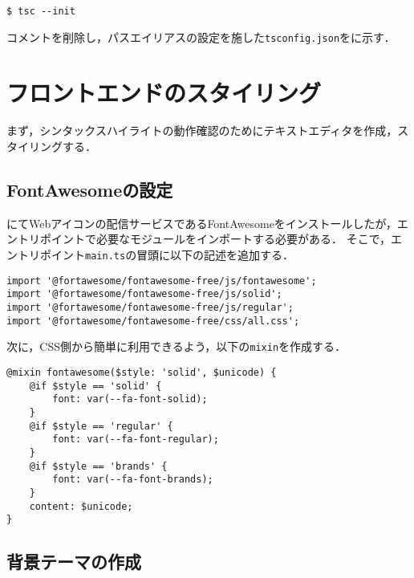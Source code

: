 \documentclass[autodetect-engine,dvi=dvipdfmx,ja=standard,
               a4j,11pt]{bxjsarticle}
\newcommand{\figref}[1]{\makebox{図~\ref{#1}}}
\newcommand{\subsecref}[1]{\makebox{第~\ref{#1}~節}}
\begin{document}
\begin{Verbatim}[numbers=none, xleftmargin=8mm, numbersep=6pt, fontsize=\small, baselinestretch=0.8]
$ tsc --init
\end{Verbatim}

コメントを削除し，パスエイリアスの設定を施した\verb|tsconfig.json|を\figref{prog:tsconfig}に示す．




\section{フロントエンドのスタイリング}

まず，シンタックスハイライトの動作確認のためにテキストエディタを作成，スタイリングする．

\subsection{FontAwesomeの設定}

\subsecref{sec:projstart}にてWebアイコンの配信サービスであるFontAwesomeをインストールしたが，エントリポイントで必要なモジュールをインポートする必要がある．
そこで，エントリポイント\verb|main.ts|の冒頭に以下の記述を追加する．

\begin{Verbatim}[numbers=none, xleftmargin=8mm, numbersep=6pt, fontsize=\small, baselinestretch=0.8]
import '@fortawesome/fontawesome-free/js/fontawesome';
import '@fortawesome/fontawesome-free/js/solid';
import '@fortawesome/fontawesome-free/js/regular';
import '@fortawesome/fontawesome-free/css/all.css';
\end{Verbatim}

次に，CSS側から簡単に利用できるよう，以下の\verb|mixin|を作成する．

\begin{Verbatim}[numbers=none, xleftmargin=8mm, numbersep=6pt, fontsize=\small, baselinestretch=0.8]
@mixin fontawesome($style: 'solid', $unicode) {
    @if $style == 'solid' {
        font: var(--fa-font-solid);
    } 
    @if $style == 'regular' {
        font: var(--fa-font-regular);
    } 
    @if $style == 'brands' {
        font: var(--fa-font-brands);
    }
    content: $unicode;
}
\end{Verbatim}

\subsection{背景テーマの作成}
\end{document}
